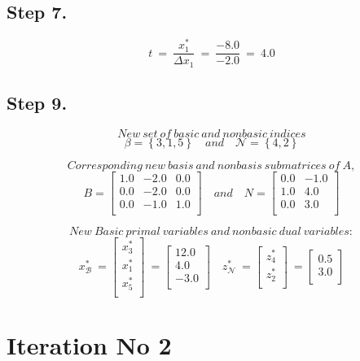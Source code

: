 \documentclass [12pt] {article}
\begin{document}
\subsection{Step 7.}
\[
t \ =\ \frac{x_{1}^{*}}{ \Delta x_{1}}\ =\ \frac{-8.0}{-2.0}\ =\ 4.0
\]
\subsection{Step 9.}

\[ New\ set\  of\  basic\  and\  nonbasic\  indices \]
\[
\beta= \left\{3, 1, 5\right\} \quad and \quad  \mathcal{N}=\left\{4, 2\right\}
\]

\[
Corresponding\ new\ basis\ and\ nonbasis\ submatrices\ of\ A,
\]
\[
B =
\begin{bmatrix}
1.0 & -2.0 & 0.0 \\ 0.0 & -2.0 & 0.0 \\ 0.0 & -1.0 & 1.0 \\ 
\end{bmatrix} \quad and \quad
\mathit{N} =
\begin{bmatrix}
0.0 & -1.0 \\ 1.0 & 4.0 \\ 0.0 & 3.0 \\ 
\end{bmatrix}
\]

\[
New\ Basic\ primal\ variables\ and\ nonbasic\ dual\ variables:
\]
\[
x_{\mathcal B}^{*}\ =\begin{bmatrix}
x_{3}^{*} \\x_{1}^{*} \\x_{5}^{*} \\
\end{bmatrix}\ =\begin{bmatrix}
12.0 \\ 4.0 \\ -3.0 \\ 
\end{bmatrix}\quad
z_{\mathcal N}^{*}\ =\begin{bmatrix}
z_{4}^{*} \\z_{2}^{*} \\
\end{bmatrix}\ =\begin{bmatrix}
0.5 \\ 3.0 \\ 
\end{bmatrix}
\]
\section*{Iteration No 2}
\end{document}
